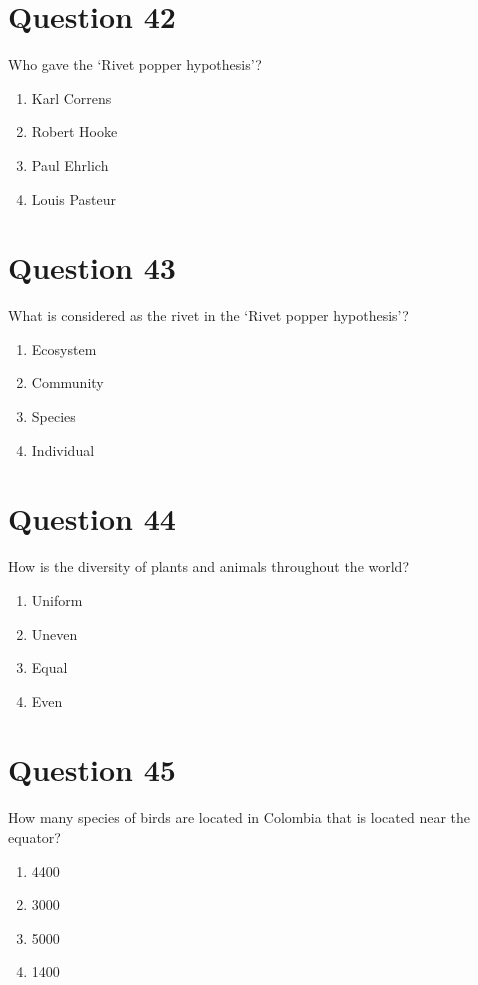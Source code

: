 \documentclass{article}
\begin{document}
\section*{Question 42}
Who gave the ‘Rivet popper hypothesis’?\newline
\begin{enumerate}[label=(\alph*)]
\item Karl Correns
\item Robert Hooke
\item Paul Ehrlich
\item Louis Pasteur
\end{enumerate}
\newpage
\section*{Question 43}
What is considered as the rivet in the ‘Rivet popper hypothesis’?\newline
\begin{enumerate}[label=(\alph*)]
\item Ecosystem
\item Community
\item Species
\item Individual
\end{enumerate}
\newpage
\section*{Question 44}
How is the diversity of plants and animals throughout the world?\newline
\begin{enumerate}[label=(\alph*)]
\item Uniform
\item Uneven
\item Equal
\item Even
\end{enumerate}
\newpage
\section*{Question 45}
How many species of birds are located in Colombia that is located near the equator?\newline
\begin{enumerate}[label=(\alph*)]
\item 4400
\item 3000
\item 5000
\item 1400
\end{enumerate}
\newpage
\end{document}
